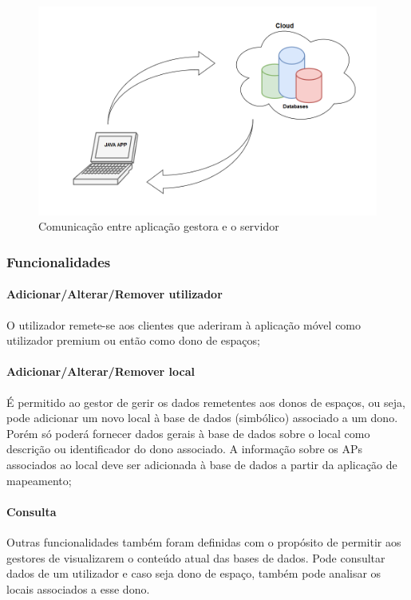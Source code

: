 \documentclass[12pt]{article} %
\begin{document}
\begin{figure}[!htbp]
		\includegraphics[width=12cm]{sistema.png}
		\centering
		\caption{Comunicação entre aplicação gestora e o servidor}

\end{figure}

\pagebreak

\subsubsection{Funcionalidades}

\paragraph{Adicionar/Alterar/Remover utilizador}
O utilizador remete-se aos clientes que aderiram à aplicação móvel como utilizador premium ou então como dono de espaços;\par

\paragraph{Adicionar/Alterar/Remover local}
É permitido ao gestor de gerir os dados remetentes aos donos de espaços, ou seja, pode adicionar um novo local à base de dados (simbólico) associado a um dono. Porém só poderá fornecer dados gerais à base de dados sobre o local como descrição ou identificador do dono associado. A informação sobre os APs associados ao local deve ser adicionada à base de dados a partir da aplicação de mapeamento;\par

\paragraph{Consulta}
Outras funcionalidades também foram definidas com o propósito de permitir aos gestores de visualizarem o conteúdo atual das bases de dados. Pode consultar dados de um utilizador e caso seja dono de espaço, também pode analisar os locais associados a esse dono.\par
\end{document}
